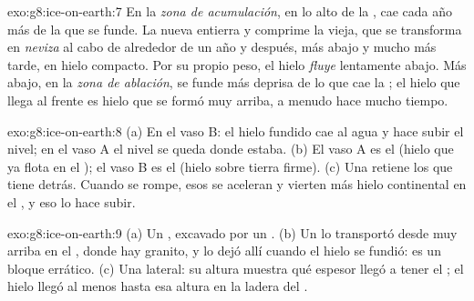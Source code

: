 \begin{solution}{exo:g8:ice-on-earth:7}
En la \emph{zona de acumulación}, en lo alto de la , cae cada año
más  de la que se funde. La  nueva entierra y comprime la 
vieja, que se transforma en \emph{neviza} al cabo de alrededor de un año y
después, más abajo y mucho más tarde, en hielo compacto. Por su propio peso,
el hielo \emph{fluye} lentamente  abajo. Más abajo, en la \emph{zona
de ablación}, se funde más deprisa de lo que cae la ; el hielo que
llega al frente es hielo que se formó muy arriba, a menudo hace mucho
tiempo.
\end{solution}

\begin{solution}{exo:g8:ice-on-earth:8}
(a) En el vaso B: el hielo fundido cae al agua y hace subir el nivel; en el
vaso A el nivel se queda donde estaba. (b) El vaso A es el  (hielo
que ya flota en el ); el vaso B es el  (hielo sobre
tierra firme). (c) Una  retiene los  que tiene
detrás. Cuando se rompe, esos  se aceleran y vierten más hielo
continental en el , y eso lo hace subir.
\end{solution}

\begin{solution}{exo:g8:ice-on-earth:9}
(a) Un , excavado por un . (b) Un  lo transportó
desde muy arriba en el , donde hay granito, y lo dejó allí cuando el
hielo se fundió: es un bloque errático. (c) Una  lateral: su altura
muestra qué espesor llegó a tener el ; el hielo llegó al menos hasta
esa altura en la ladera del .
\end{solution}

